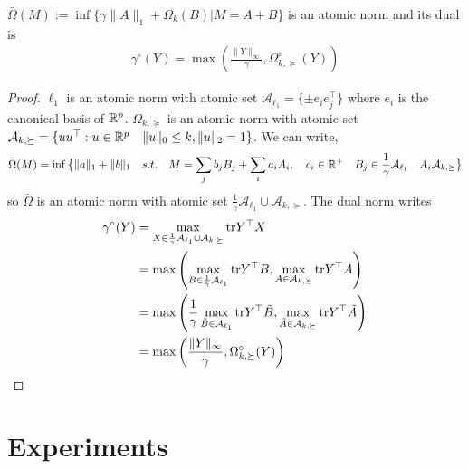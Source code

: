 \documentclass{article}
\begin{document}
\begin{lemma} $\bar{\Omega}(M):=\inf\{\gamma\|A\|_{1}+\Omega_k(B)|M=A+B\}$ is an atomic norm and its dual is 
\begin{align*}
\gamma^{\circ}(Y)=\max\left(\frac{\|Y\|_{\infty}}{\gamma},\Omega_{k,\succeq}^{\circ}(Y)\right)
\end{align*}
\end{lemma}

\begin{proof}
$\ell_1$ is an atomic norm with atomic set $\mathcal{A}_{\ell_{1}}=\{\pm e_i e_j^{\top}\}$ where $e_i$ is the canonical basis of $\mathbb{R}^p$. $\Omega_{k,\succeq}$  is an atomic norm with atomic set $\mathcal{A}_{k,\succeq}=\{uu^{\top}  :  u\in\mathbb{R}^{p} \quad \|u\|_0 \leq k, \|u\|_2 = 1\}$. We can write,
$$
\bar{\Omega}(M)= \inf \big\{\|a\|_1+\|b\|_1 \quad s.t. \quad M=\sum_{j} b_j B_{j} + \sum_{i} a_i A_{i}, \quad c_i\in \mathbb{R}^{+}\quad B_j\in\frac{1}{\gamma}\mathcal{A}_{\ell_{1}} \quad A_i\mathcal{A}_{k,\succeq} \big\}
$$
so $\bar{\Omega}$ is an atomic norm with atomic set $\frac{1}{\gamma}\mathcal{A}_{\ell_{1}}\cup\mathcal{A}_{k,\succeq}$. The dual norm writes
\begin{align}
\gamma^{\circ}(Y)
& = \max_{X\in\frac{1}{\gamma}\mathcal{A}_{\ell_{1}}\cup\mathcal{A}_{k,\succeq}} {\rm tr}{Y^{\top}X}\\
& =\max\left(\max_{B\in\frac{1}{\gamma}\mathcal{A}_{\ell_{1}}}{\rm tr}{Y^{\top}B}, \max_{A\in\mathcal{A}_{k,\succeq}}{\rm tr}{Y^{\top}A}\right)\\
& =\max\left(\frac{1}{\gamma}\max_{\tilde{B}\in\mathcal{A}_{\ell_{1}}}{\rm tr}{Y^{\top}\tilde{B}}, \max_{\tilde{A}\in\mathcal{A}_{k,\succeq}}{\rm tr}{Y^{\top}\tilde{A}}\right)\\
& =\max\left(\frac{\|Y\|_{\infty}}{\gamma},\Omega_{k,\succeq}^{\circ}(Y)\right)
\end{align}
%
%
\end{proof}

\section{Experiments}
\end{document}

